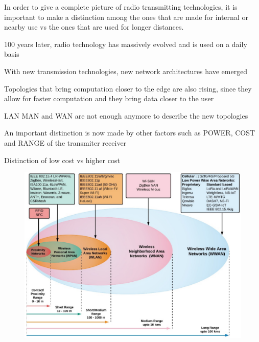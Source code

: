 	
	In order to give a complete picture of radio transmitting technologies, it is important to make a distinction among the ones that are made for internal or nearby use vs the ones that are used for longer distances.
	
	100 years later, radio technology has massively evolved and is used on a daily basis
	
	
	
	With new transmission technologies, new network architectures have emerged
	
	Topologies that bring computation closer to the edge are also rising, since they allow for faster computation and they bring data closer to the user
	
	LAN MAN and WAN are not enough anymore to describe the new topologies
	
	An important distinction is now made by other factors such as POWER, COST and RANGE of the transmiter receiver
	
	
	Distinction of low cost vs higher cost
	
	\begin{figure}
		\centering
		\includegraphics[height=\textwidth, angle=90]{resources/img/iot_range}
		\caption{}
	\end{figure}
		

